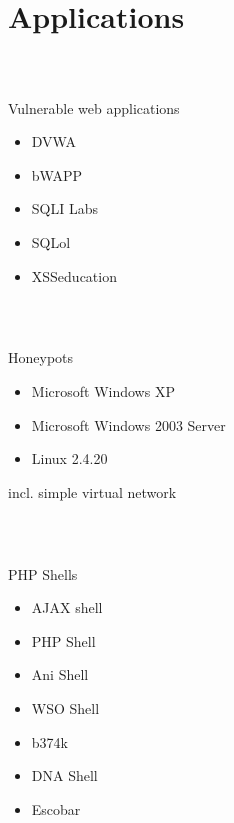 \section{Applications}
%
\begin{frame}
\frametitle{\\}
\vspace{2pt}
%
{\LARGE Vulnerable web applications \newline}
\begin{itemize}
  \item DVWA
  \item bWAPP
  \item SQLI Labs
  \item SQLol
  \item XSSeducation
\end{itemize}
\end{frame}
%
\begin{frame}
\frametitle{\\}
\vspace{2pt}
%
{\LARGE Honeypots \newline}
\begin{itemize}
  \item Microsoft Windows XP
  \item Microsoft Windows 2003 Server
  \item Linux 2.4.20
\end{itemize}
incl. simple virtual network
\end{frame}
%
\begin{frame}
\frametitle{\\}
\vspace{2pt}
%
{\LARGE PHP Shells \newline}
\begin{itemize}
  \item AJAX shell
  \item PHP Shell
  \item Ani Shell
  \item WSO Shell
  \item b374k
  \item DNA Shell
  \item Escobar
\end{itemize}
\end{frame}
